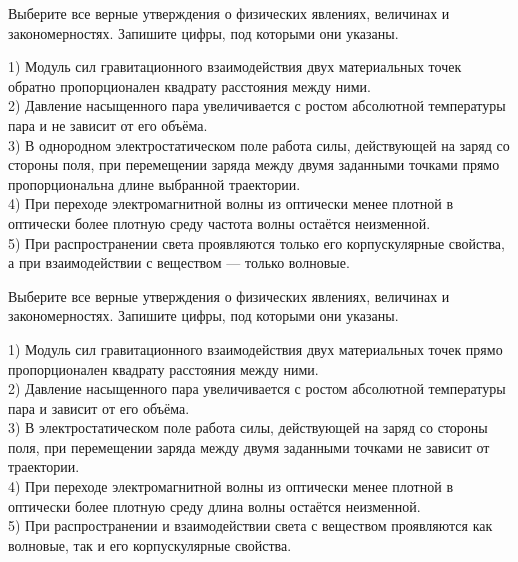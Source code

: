 \begin{taskbasic}[code={\label{task:kim18_img3}}]
Выберите все верные утверждения о физических явлениях, величинах и закономерностях. Запишите цифры, под которыми они указаны.

1) Модуль сил гравитационного взаимодействия двух материальных точек обратно пропорционален квадрату расстояния между ними.\\
2) Давление насыщенного пара увеличивается с ростом абсолютной температуры пара и не зависит от его объёма.\\
3) В однородном электростатическом поле работа силы, действующей на заряд со стороны поля, при перемещении заряда между двумя заданными точками прямо пропорциональна длине выбранной траектории.\\
4) При переходе электромагнитной волны из оптически менее плотной в оптически более плотную среду частота волны остаётся неизменной.\\
5) При распространении света проявляются только его корпускулярные свойства, а при взаимодействии с веществом --- только волновые.

\end{taskbasic}

\begin{taskbasic}[code={\label{task:kim18_img4}}]
Выберите все верные утверждения о физических явлениях, величинах и закономерностях. Запишите цифры, под которыми они указаны.

1) Модуль сил гравитационного взаимодействия двух материальных точек прямо пропорционален квадрату расстояния между ними.\\
2) Давление насыщенного пара увеличивается с ростом абсолютной температуры пара и зависит от его объёма.\\
3) В электростатическом поле работа силы, действующей на заряд со стороны поля, при перемещении заряда между двумя заданными точками не зависит от траектории.\\
4) При переходе электромагнитной волны из оптически менее плотной в оптически более плотную среду длина волны остаётся неизменной.\\
5) При распространении и взаимодействии света с веществом проявляются как волновые, так и его корпускулярные свойства.

\end{taskbasic}

